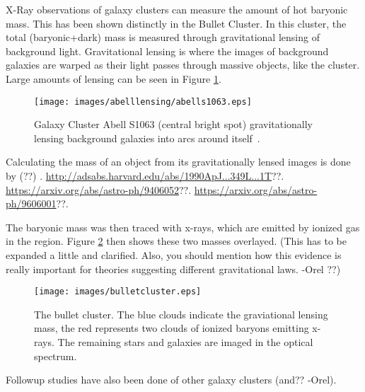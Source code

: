     X-Ray observations of galaxy clusters can measure the amount of hot baryonic mass.
    This has been shown distinctly in the Bullet Cluster\cite{bullet_cluster}.
    In this cluster, the total (baryonic+dark) mass is measured through gravitational lensing of background light.
    Gravitational lensing is where the images of background galaxies are warped as their light passes through massive objects, like the cluster.
    Large amounts of lensing can be seen in Figure \ref{fig:abelllensing}.
    
    \begin{figure}[ht]
      \centering
      \texttt{[image: images/abelllensing/abells1063.eps]}
      \caption[Abell S1063 Lensing]{
        Galaxy Cluster Abell S1063 (central bright spot) gravitationally lensing background galaxies into arcs around itself~\cite{abelllensing,clusterimages}.
      }
      \label{fig:abelllensing}
    \end{figure}
    
    Calculating the mass of an object from its gravitationally lensed images is done by {\color{red}(??)} \cite{}.
    {\color{red}\url{http://adsabs.harvard.edu/abs/1990ApJ...349L...1T}??}.
    {\color{red}\url{https://arxiv.org/abs/astro-ph/9406052}??}.
    {\color{red}\url{https://arxiv.org/abs/astro-ph/9606001}??}.
    
    The baryonic mass was then traced with x-rays, which are emitted by ionized gas in the region.
    Figure \ref{fig:bullet} then shows these two masses overlayed.
    {\color{red}(This has to be expanded a little and clarified. Also, you should mention how this evidence is really important for theories suggesting different gravitational laws. -Orel ??)}

    \begin{figure}[ht]
      \centering
      \texttt{[image: images/bulletcluster.eps]}
      \caption[The Bullet Cluster]{
        The bullet cluster\cite{bullet_cluster_combined_image}.
        The blue clouds indicate the graviational lensing mass\cite{bullet_cluster}, the red represents two clouds of ionized baryons emitting x-rays\cite{bullet_cluster_chandramap}.
        The remaining stars and galaxies are imaged in the optical spectrum\cite{bullet_cluster_composite}.}
      \label{fig:bullet}
    \end{figure}

    Followup studies have also been done of other galaxy clusters {\color{red}(and?? -Orel)}.

